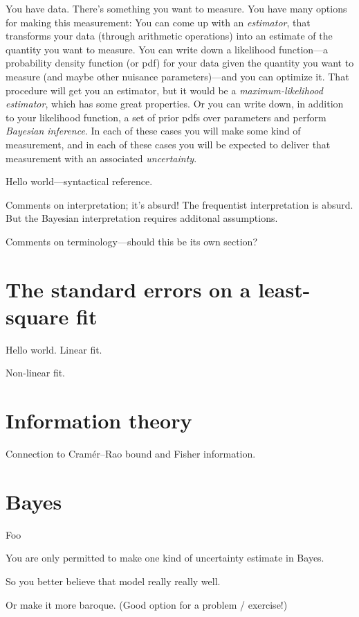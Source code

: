 \documentclass[12pt, letterpaper]{article}
\begin{document}
You have data. There's something you want to measure. You have many
options for making this measurement: You can come up with an
\textsl{estimator}, that transforms your data (through arithmetic
operations) into an estimate of the quantity you want to measure. You
can write down a likelihood function---a probability density function
(or pdf) for your data given the quantity you want to measure (and
maybe other nuisance parameters)---and you can optimize it. That
procedure will get you an estimator, but it would be a
\textsl{maximum-likelihood estimator}, which has some great
properties. Or you can write down, in addition to your likelihood
function, a set of prior pdfs over parameters and perform
\textsl{Bayesian inference}.  In each of these cases you will make
some kind of measurement, and in each of these cases you will be
expected to deliver that measurement with an associated \textsl{uncertainty}.

Hello world---syntactical reference.

Comments on interpretation; it's absurd! The frequentist interpretation is
absurd. But the Bayesian interpretation requires additonal assumptions.

Comments on terminology---should this be its own section?

\section{The standard errors on a least-square fit}

Hello world. Linear fit.

Non-linear fit.

\section{Information theory}

Connection to Cram\'er--Rao bound and Fisher information.

\section{Bayes}

Foo

You are only permitted to make one kind of uncertainty estimate in Bayes.

So you better believe that model really really well.

Or make it more baroque. (Good option for a problem / exercise!)
\end{document}
